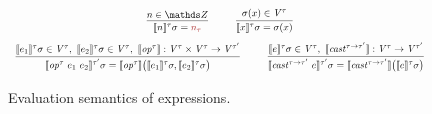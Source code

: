 \begin{figure}
\[
\begin{array}{c}
\ruledefnonamesmall
{
    n \in \Z
}
{
    \evalexprty{n}{\localstore}{\tau} = \valoftype{n}{\tau}
}
\quad\quad
\ruledefnonamesmall
{
    \mapaccess{\localstore}{x} \in \Vals^{\tau}
}
{
    \evalexprty{x}{\localstore}{\tau} = \mapaccess{\localstore}{x}
}
\\[5pt]
\ruledefnonamesmall
{
    \evalexprty{e_1}{\localstore}{\tau} \in \Vals^{\tau}, \
    \evalexprty{e_2}{\localstore}{\tau} \in \Vals^{\tau}, \
    \sem{\toper^{\tau}} : \Vals^{\tau} \times \Vals^{\tau} \to \Vals^{\tau'}
}
{
    \evalexprty{\toper^\tau~e_1~e_2}{\localstore}{\tau'} = \sem{\toper^\tau}\big(\evalexprty{e_1}{\localstore}{\tau}, \evalexprty{e_2}{\localstore}{\tau}\big)
}
\quad\quad
\ruledefnonamesmall
{
    \evalexprty{e}{\localstore}{\tau} \in \Vals^{\tau}, \
    \sem{\tcast^{\tau\to\tau'}} : \Vals^{\tau} \to \Vals^{\tau'}
}
{
    \evalexprty{\tcast^{\tau\to\tau'}~e}{\localstore}{\tau'} = \sem{\tcast^{\tau\to\tau'}}\big(\evalexprty{e}{\localstore}{\tau}\big)
}
\end{array}
\]
\caption{Evaluation semantics of \llvm expressions.}
\label{figure:expr-semantics}
\end{figure}

